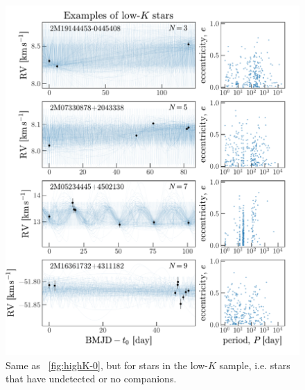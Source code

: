 \documentclass[modern, letterpaper]{aastex62}
\begin{document}
\begin{figure}[hp]
\begin{center}
\includegraphics[width=\textwidth]{lowK-0}
\end{center}
\caption{%
Same as \figurename~\ref{fig:highK-0}, but for stars in the low-$K$ sample, i.e.
stars that have undetected or no companions.
\label{fig:lowK-0}
}
\end{figure}
\end{document}
